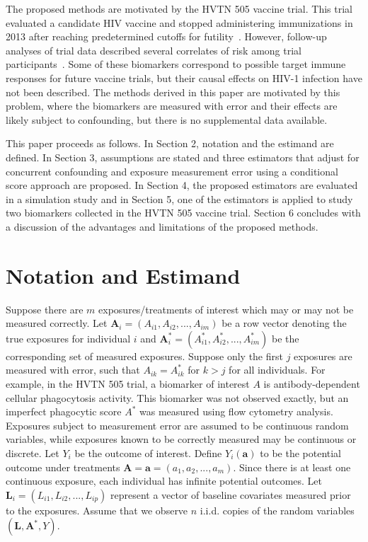 \documentclass[useAMS,usenatbib,referee]{biom}
\begin{document}
The proposed methods are motivated by the HVTN 505 vaccine trial. This trial evaluated a candidate HIV vaccine and stopped administering immunizations in 2013 after reaching predetermined cutoffs for futility~\citep{hammer2013}. However, follow-up analyses of trial data described several correlates of risk among trial participants~\citep{decamp2017,janes2017,fong2018,neidich2019}. Some of these biomarkers correspond to possible target immune responses for future vaccine trials, but their causal effects on HIV-1 infection have not been described. The methods derived in this paper are motivated by this problem, where the biomarkers are measured with error and their effects are likely subject to confounding, but there is no supplemental data available.

This paper proceeds as follows. In Section 2, notation and the estimand are defined. In Section 3, assumptions are stated and three estimators that adjust for concurrent confounding and exposure measurement error using a conditional score approach are proposed. In Section 4, the proposed estimators are evaluated in a simulation study and in Section 5, one of the estimators is applied to study two biomarkers collected in the HVTN 505 vaccine trial. Section 6 concludes with a discussion of the advantages and limitations of the proposed methods.

\section{Notation and Estimand}
\label{s:notation}

Suppose there are $m$ exposures/treatments of interest which may or may not be measured correctly. Let $\bm{A}_{i} = (A_{i1}, A_{i2}, ..., A_{im})$ be a row vector denoting the true exposures for individual $i$ and $\bm{A}^{*}_{i} =  (A^{*}_{i1}, A^{*}_{i2}, ..., A^{*}_{im})$ be the corresponding set of measured exposures. Suppose only the first $j$ exposures are measured with error, such that $A_{ik} = A^{*}_{ik}$ for $k > j$ for all individuals. For example, in the HVTN 505 trial, a biomarker of interest $A$ is antibody-dependent cellular phagocytosis activity. This biomarker was not observed exactly, but an imperfect phagocytic score $A^{*}$ was measured using flow cytometry analysis. Exposures subject to measurement error are assumed to be continuous random variables, while exposures known to be correctly measured may be continuous or discrete. Let $Y_{i}$ be the outcome of interest. Define $Y_{i}(\bm{a})$ to be the potential outcome under treatments $\bm{A} = \bm{a} = (a_{1}, a_{2}, ..., a_{m})$. Since there is at least one continuous exposure, each individual has infinite potential outcomes. Let $\bm{L}_{i} =  (L_{i1}, L_{i2}, ..., L_{ip})$ represent a vector of baseline covariates measured prior to the exposures. Assume that we observe $n$ i.i.d. copies of the random variables $(\bm{L}, \bm{A}^{*}, Y)$.
\end{document}
